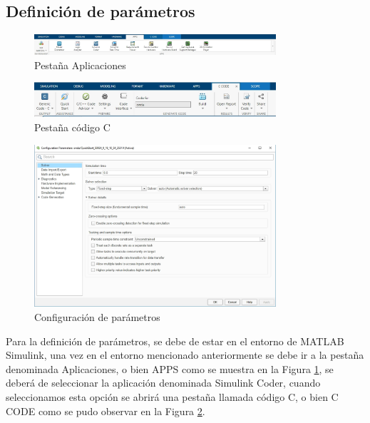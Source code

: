 \subsection{Definición de parámetros}

\begin{figure}[h!]
    \centering
    \includegraphics[width=0.8\textwidth]{fig/especifico_2/M2MT/paso_a_paso_mtmt/apps.png}
    \caption{Pestaña Aplicaciones}
    \label{fig:pestana_apps}
\end{figure}

\begin{figure}[h!]
    \centering
    \includegraphics[width=0.8\textwidth]{fig/especifico_2/M2MT/paso_a_paso_mtmt/c_code.png}
    \caption{Pestaña código C}
    \label{fig:pestana_c_code}
\end{figure}

\begin{figure}[h!]
    \centering
    \includegraphics[width=0.8\textwidth]{fig/especifico_2/M2MT/paso_a_paso_mtmt/configuration_parameters.png}
    \caption{Configuración de parámetros}
    \label{fig:pestana_config}
\end{figure}

Para la definición de parámetros, se debe de estar en el entorno de MATLAB Simulink, una vez en el entorno mencionado anteriormente se debe ir a la pestaña denominada Aplicaciones, o bien APPS como se muestra en la Figura \ref{fig:pestana_apps}, se deberá de seleccionar la aplicación denominada Simulink Coder, cuando seleccionamos esta opción se abrirá una pestaña llamada código C, o bien C CODE como se pudo observar en la Figura \ref{fig:pestana_c_code}.

